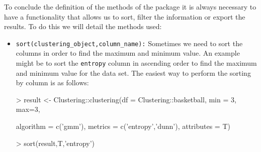 To conclude the definition of the methods of the package it is always necessary to have a functionality that allows us to sort, filter the information or export the results. To do this we will detail the methods used:

\begin{itemize}
  \item \texttt{sort(clustering\_object,column\_name):} Sometimes we need to sort the columns in order to find the maximum and minimum value. An example might be to sort the \texttt{entropy} column in ascending order to find the maximum and minimum value for the data set. The easiest way to perform the sorting by column is as follows:
  \begin{Schunk}
\begin{Sinput}
> result <- Clustering::clustering(df = Clustering::basketball, min = 3, max=3,
\end{Sinput}
\begin{Sinput}
           algorithm = c('gmm'), metrics = c('entropy','dunn'), attributes = T)
 \end{Sinput}
\end{Schunk}
\begin{Schunk}
\begin{Sinput}
>  sort(result,T,'entropy')
\end{Sinput}
\end{Schunk}


\end{itemize}
